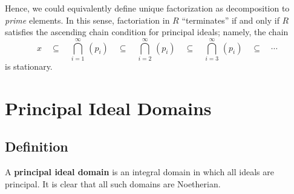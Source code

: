 \documentclass[11pt]{article}
\begin{document}
Hence, we could equivalently define unique factorization as decomposition to \textit{prime} elements. In this sense, factoriation in $R$ ``terminates'' if and only if $R$ satisfies the ascending chain condition for principal ideals; namely, the chain
\[
  x \quad \subseteq \quad \bigcap\limits_{i = 1}^{\infty} \, (p_{i}) \quad \subseteq \quad \bigcap\limits_{i = 2}^{\infty} \, (p_{i}) \quad \subseteq \quad \bigcap\limits_{i = 3}^{\infty} \, (p_{i}) \quad \subseteq \quad \cdots
\]
is stationary.


\section{Principal Ideal Domains}


\subsection{Definition}

A \textbf{principal ideal domain} is an integral domain in which all ideals are principal. It is clear that all such domains are Noetherian.

\newpage
\end{document}
